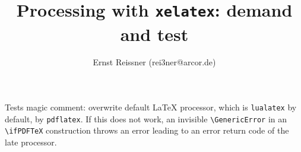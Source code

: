 \documentclass{article}
\title{Processing with \texttt{xelatex}: demand and test}
\author{Ernst Reissner (rei3ner@arcor.de)}
\date{}
\begin{document}
\maketitle



Tests magic comment: overwrite default \LaTeX{} processor, which is \texttt{lualatex} by default, by \texttt{pdflatex}. 
If this does not work, an invisible \texttt{\textbackslash{}GenericError} 
in an \texttt{\textbackslash{}ifPDFTeX} construction throws an error leading to an error return code 
of the late processor. 
\end{document}

